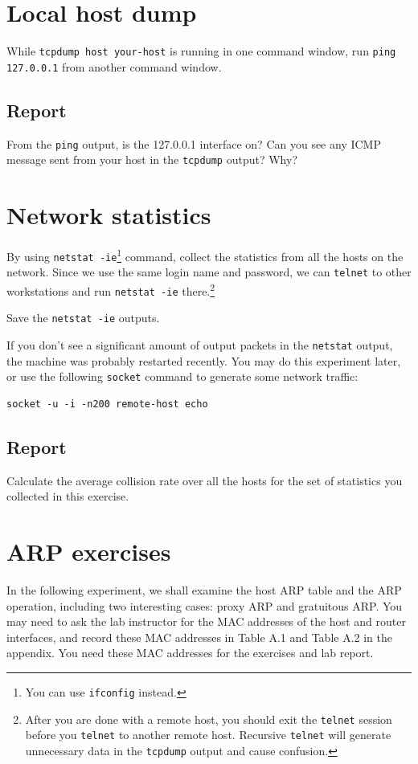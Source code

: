 \documentclass{../UTNetLab}
\begin{document}
\section{Local host dump}
    While \lstinline[emph={your-host}]{tcpdump host your-host} is running in one command window, run \lstinline{ping 127.0.0.1} from another command window.
    
    \subsection*{Report}
    From the \lstinline{ping} output, is the 127.0.0.1 interface on?
    Can you see any ICMP message sent from your host in the \lstinline{tcpdump} output?
    Why?


\section{Network statistics}
    By using \lstinline{netstat -ie}\footnote{You can use \lstinline{ifconfig} instead.} command, collect the statistics from all the hosts on the network.
    Since we use the same login name and password, we can \lstinline{telnet} to other workstations and run \lstinline{netstat -ie} there.\footnote{%
    After you are done with a remote host, you should exit the \lstinline{telnet} session before you \lstinline{telnet} to another remote host.
    Recursive \lstinline{telnet} will generate unnecessary data in the \lstinline{tcpdump} output and cause confusion.
    }

    Save the \lstinline{netstat -ie} outputs.

    If you don’t see a significant amount of output packets in the \lstinline{netstat} output, the machine was probably restarted recently. You may do this experiment later, or use the following \lstinline{socket} command to generate some network traffic:
    \begin{lstlisting}[emph={remote-host}]
socket -u -i -n200 remote-host echo
    \end{lstlisting}
    
    \subsection*{Report}
    Calculate the average collision rate over all the hosts for the set of statistics you collected in this exercise.

\section*{ARP exercises}
    In the following experiment, we shall examine the host ARP table and the ARP operation, including two interesting cases: proxy ARP and gratuitous ARP. You may need to ask the lab instructor for the MAC addresses of the host and router interfaces, and record these MAC addresses in Table A.1 and Table A.2 in the appendix.
    You need these MAC addresses for the exercises and lab report.
\end{document}
